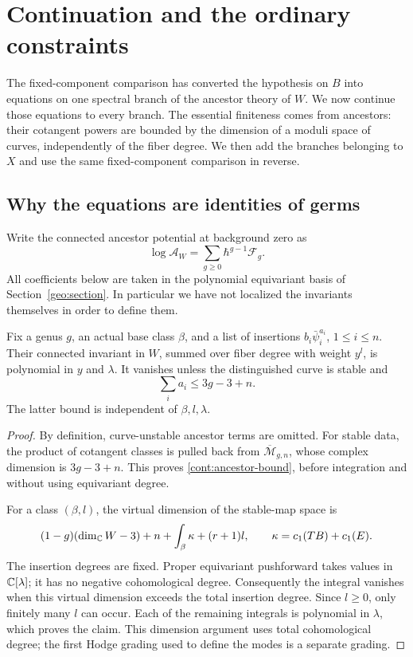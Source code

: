 \section{Continuation and the ordinary constraints}
\label{cont:section}

The fixed-component comparison has converted the hypothesis on $B$
into equations on one spectral branch of the ancestor theory of $W$.
We now continue those equations to every branch. The essential
finiteness comes from ancestors: their cotangent powers are bounded
by the dimension of a moduli space of curves, independently of the
fiber degree. We then add the branches belonging to $X$ and use the
same fixed-component comparison in reverse.

\subsection{Why the equations are identities of germs}

Write the connected ancestor potential at background zero as
\[
 \log\mathcal A_W=\sum_{g\geq0}\hbar^{g-1}\mathcal F_g.
\]
All coefficients below are taken in the polynomial equivariant
basis of Section~\ref{geo:section}. In particular we have not
localized the invariants themselves in order to define them.

\begin{lemma}
\label{cont:polynomiality}
Fix a genus $g$, an actual base class $\beta$, and a list of
insertions $b_i\bar\psi_i^{a_i}$, $1\leq i\leq n$.
Their connected invariant in $W$, summed over fiber degree with
weight $y^l$, is polynomial in $y$ and $\lambda$.
It vanishes unless the distinguished curve is stable and
\begin{equation}
                   \sum_i a_i\leq 3g-3+n.
 \label{cont:ancestor-bound}
\end{equation}
The latter bound is independent of $\beta,l,\lambda$.
\end{lemma}

\begin{proof}
By definition, curve-unstable ancestor terms are omitted. For stable
data, the product of cotangent classes is pulled back from
$\overline{\mathcal M}_{g,n}$, whose complex dimension is $3g-3+n$.
This proves \eqref{cont:ancestor-bound}, before integration and
without using equivariant degree.

For a class $(\beta,l)$, the virtual dimension of the stable-map
space is
\[
 (1-g)(\dim_\mathbb C W-3)+n+\int_\beta\kappa+(r+1)l,
 \qquad \kappa=c_1(TB)+c_1(E).
\]
The insertion degrees are fixed. Proper equivariant pushforward
takes values in $\mathbb C[\lambda]$; it has no negative cohomological
degree. Consequently the integral vanishes when this virtual
dimension exceeds the total insertion degree. Since $l\geq0$,
only finitely many $l$ can occur. Each of the remaining integrals
is polynomial in $\lambda$, which proves the claim.
This dimension argument uses total cohomological degree; the
first Hodge grading used to define the modes is a separate
grading.
\end{proof}

